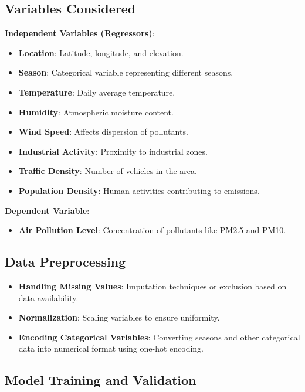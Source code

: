 \documentclass[12pt]{article}
\begin{document}
\subsection{Variables Considered}

\textbf{Independent Variables (Regressors)}:

\begin{itemize}
    \item \textbf{Location}: Latitude, longitude, and elevation.
    \item \textbf{Season}: Categorical variable representing different seasons.
    \item \textbf{Temperature}: Daily average temperature.
    \item \textbf{Humidity}: Atmospheric moisture content.
    \item \textbf{Wind Speed}: Affects dispersion of pollutants.
    \item \textbf{Industrial Activity}: Proximity to industrial zones.
    \item \textbf{Traffic Density}: Number of vehicles in the area.
    \item \textbf{Population Density}: Human activities contributing to emissions.
\end{itemize}

\textbf{Dependent Variable}:

\begin{itemize}
    \item \textbf{Air Pollution Level}: Concentration of pollutants like PM2.5 and PM10.
\end{itemize}

\subsection{Data Preprocessing}

\begin{itemize}
    \item \textbf{Handling Missing Values}: Imputation techniques or exclusion based on data availability.
    \item \textbf{Normalization}: Scaling variables to ensure uniformity.
    \item \textbf{Encoding Categorical Variables}: Converting seasons and other categorical data into numerical format using one-hot encoding.
\end{itemize}

\subsection{Model Training and Validation}
\end{document}

